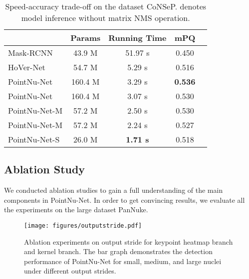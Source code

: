 \documentclass[lettersize,journal]{IEEEtran}
\begin{document}
\begin{table}[]\footnotesize
\centering
\caption{Speed-accuracy trade-off on the dataset CoNSeP.   denotes model inference without matrix NMS operation.}
\begin{tabular}{lcccl}
\toprule
 & Params  & Running Time & \multicolumn{1}{c}{mPQ} \\ \midrule
Mask-RCNN & 43.9 M & 51.97 s & 0.450 \\
HoVer-Net & 54.7 M & 5.29 s & 0.516 \\
PointNu-Net & 160.4 M & 3.29 s & \textbf{0.536} \\
PointNu-Net & 160.4 M & 3.07 s & 0.530 \\
PointNu-Net-M & 57.2 M & 2.50 s & 0.530 \\
PointNu-Net-M  & 57.2 M & 2.24 s & 0.527 \\
PointNu-Net-S  & 26.0 M & \textbf{1.71 s} & 0.518 \\ \bottomrule
\end{tabular}
\label{tab:tf}
\end{table}


\subsection{Ablation Study}
We conducted ablation studies to gain a full understanding of the main components in PointNu-Net. In order to get convincing results, we evaluate all the experiments on the large dataset PanNuke.
 
 \begin{figure}[t]
\centering
\texttt{[image: figures/outputstride.pdf]}
\caption{Ablation experiments on output stride for keypoint heatmap branch and kernel branch. The bar graph demonstrates the detection performance of PointNu-Net for small, medium, and large nuclei under different output strides.}
\label{fig:stride}
\end{figure}
\end{document}
